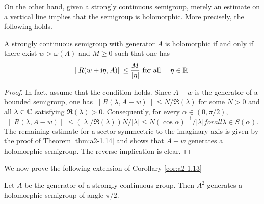 On the other hand, given a strongly continuous semigroup, merely an estimate on a vertical line implies that the semigroup is holomorphic.
More precisely, the following holds.
\begin{corollary*}\label{cor:a2-1.14-kgk}
A strongly continuous semigroup with generator $A$ is holomorphic if and only if there exist $w > \omega(A)$ and $M \geq 0$ such that one has
\[
    \|R(w+\mathrm{i}\eta,A)\| \leq \frac{M}{|\eta|} \text{ for all } \quad \eta \in \mathbb{R}.
\]
\end{corollary*}

\begin{proof}
In fact, assume that the condition holds.
Since $A-w$ is the generator of a bounded semigroup, one has 
$\|R(\lambda,A-w)\| \leq N/\Re(\lambda)$ for some $N > 0$ and all $\lambda \in \mathbb{C}$ 
satisfying $\Re(\lambda) > 0$.
Consequently, for every $\alpha \in (0,\pi/2)$, 
\[
\|R(\lambda,A-w)\| \leq (|\lambda|/\Re(\lambda))N/|\lambda| \leq N(\cos\alpha)^{-1}/|\lambda| for all \lambda \in S(\alpha) .
\]
The remaining estimate for a sector symmectric to the imaginary axis is given by the proof of Theorem \ref{thm:a2-1.14}    
and shows that $A-w$ generates a holomorphic semigroup.
The reverse implication is clear.
\end{proof}

We now prove the following extension of Corollary \ref{cor:a2-1.13}  

\begin{theorem}\label{thm:a2-1.15}
Let $A$ be the generator of a strongly continuous group.
Then $A^2$ generates a holomorphic semigroup of angle $\pi/2$.
\end{theorem}

